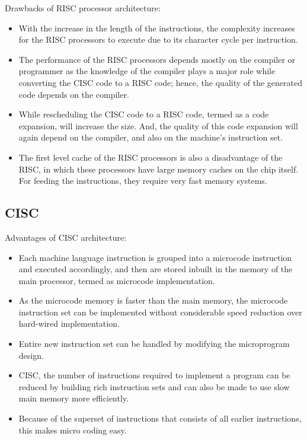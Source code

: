 \documentclass[doc,natbib,12pt]{apa6}
\begin{document}
	Drawbacks of RISC processor architecture: \citep{elprocus}
	\begin{itemize}
		\item With the increase in the length of the instructions, the complexity increases for the RISC processors to execute due to its character cycle per instruction.
		\item The performance of the RISC processors depends mostly on the compiler or programmer as the knowledge of the compiler plays a major role while converting the CISC code to a RISC code; hence, the quality of the generated code depends on the compiler.
		\item While rescheduling the CISC code to a RISC code, termed as a code expansion, will increase the size. And, the quality of this code expansion will again depend on the compiler, and also on the machine’s instruction set.
		\item The first level cache of the RISC processors is also a disadvantage of the RISC, in which these processors have large memory caches on the chip itself. For feeding the instructions, they require very fast memory systems.
	\end{itemize}
	
	\subsection{CISC}
	
	Advantages of CISC architecture: \citep{elprocus}
	\begin{itemize}
		\item Each machine language instruction is grouped into a microcode instruction and executed accordingly, and then are stored inbuilt in the memory of the main processor, termed as microcode implementation.
		\item As the microcode memory is faster than the main memory, the microcode instruction set can be implemented without considerable speed reduction over hard-wired implementation.
		\item Entire new instruction set can be handled by modifying the microprogram design.
		\item CISC, the number of instructions required to implement a program can be reduced by building rich instruction sets and can also be made to use slow main memory more efficiently.
		\item Because of the superset of instructions that consists of all earlier instructions, this makes micro coding easy.
	\end{itemize}
	
\end{document}
